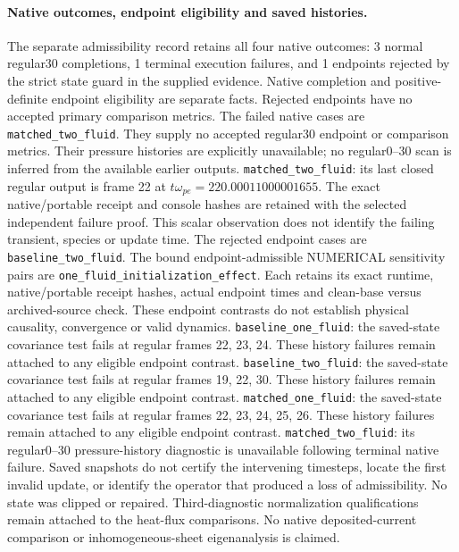 \paragraph{Native outcomes, endpoint eligibility and saved histories.}
The separate admissibility record retains all four native outcomes: 3 normal regular30 completions, 1 terminal execution failures, and 1 endpoints rejected by the strict state guard in the supplied evidence. Native completion and positive-definite endpoint eligibility are separate facts. Rejected endpoints have no accepted primary comparison metrics.
The failed native cases are \nolinkurl{matched_two_fluid}. They supply no accepted regular30 endpoint or comparison metrics. Their pressure histories are explicitly unavailable; no regular0--30 scan is inferred from the available earlier outputs.
\nolinkurl{matched_two_fluid}: its last closed regular output is frame 22 at $t\omega_{pe}=220.00011000001655$. The exact native/portable receipt and console hashes are retained with the selected independent failure proof. This scalar observation does not identify the failing transient, species or update time.
The rejected endpoint cases are \nolinkurl{baseline_two_fluid}.
The bound endpoint-admissible NUMERICAL sensitivity pairs are \nolinkurl{one_fluid_initialization_effect}. Each retains its exact runtime, native/portable receipt hashes, actual endpoint times and clean-base versus archived-source check. These endpoint contrasts do not establish physical causality, convergence or valid dynamics.
\nolinkurl{baseline_one_fluid}: the saved-state covariance test fails at regular frames 22, 23, 24. These history failures remain attached to any eligible endpoint contrast.
\nolinkurl{baseline_two_fluid}: the saved-state covariance test fails at regular frames 19, 22, 30. These history failures remain attached to any eligible endpoint contrast.
\nolinkurl{matched_one_fluid}: the saved-state covariance test fails at regular frames 22, 23, 24, 25, 26. These history failures remain attached to any eligible endpoint contrast.
\nolinkurl{matched_two_fluid}: its regular0--30 pressure-history diagnostic is unavailable following terminal native failure.
Saved snapshots do not certify the intervening timesteps, locate the first invalid update, or identify the operator that produced a loss of admissibility. No state was clipped or repaired.
Third-diagnostic normalization qualifications remain attached to the heat-flux comparisons. No native deposited-current comparison or inhomogeneous-sheet eigenanalysis is claimed.
